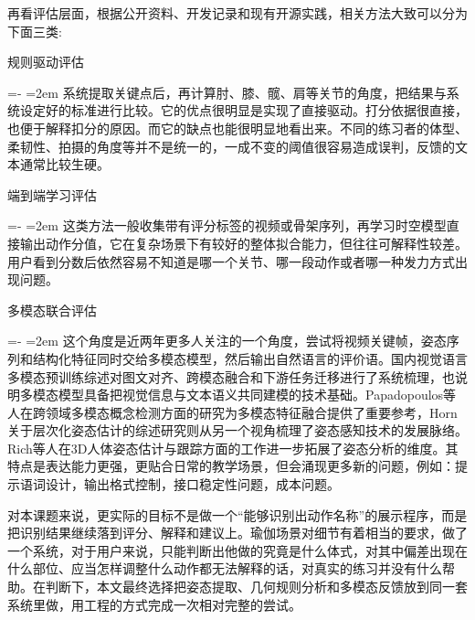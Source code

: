 \documentclass[UTF8,twoside]{ctexrep}
\makeatletter
\def@NAT@last@yr{\@citea}%
\def@NAT@last@yr{-\NAT@penalty}%
\newcommand{\researchitem}[2]{%
  \item #1%
  \par\begingroup
    \leftskip=-\leftmargin
    \rightskip=0pt
    \parindent=2em
    \noindent\hspace*{2em}\ignorespaces#2\unskip\par
  \endgroup
}
\makeatother
\begin{document}
再看评估层面，根据公开资料、开发记录和现有开源实践，相关方法大致可以分为下面三类:
\begin{researchlist}
  
\researchitem{规则驱动评估}{
    系统提取关键点后，再计算肘、膝、髋、肩等关节的角度，把结果与系统设定好的标准进行比较。它的优点很明显是实现了直接驱动。打分依据很直接，也便于解释扣分的原因。而它的缺点也能很明显地看出来。不同的练习者的体型、柔韧性、拍摄的角度等并不是统一的，一成不变的阈值很容易造成误判，反馈的文本通常比较生硬。
  }
  
\researchitem{端到端学习评估}{
    这类方法一般收集带有评分标签的视频或骨架序列，再学习时空模型直接输出动作分值，它在复杂场景下有较好的整体拟合能力，但往往可解释性较差。用户看到分数后依然容易不知道是哪一个关节、哪一段动作或者哪一种发力方式出现问题。
  }
  
\researchitem{多模态联合评估}{
    这个角度是近两年更多人关注的一个角度，尝试将视频关键帧，姿态序列和结构化特征同时交给多模态模型，然后输出自然语言的评价语。国内视觉语言多模态预训练综述对图文对齐、跨模态融合和下游任务迁移进行了系统梳理，也说明多模态模型具备把视觉信息与文本语义共同建模的技术基础\cite{ref_cn_visual_language_pretraining}。Papadopoulos等人\cite{ref_multimodal_concept}在跨领域多模态概念检测方面的研究为多模态特征融合提供了重要参考，Horn\cite{ref_pose_hierarchy}关于层次化姿态估计的综述研究则从另一个视角梳理了姿态感知技术的发展脉络。Rich等人\cite{ref_3d_pose_tracking}在3D人体姿态估计与跟踪方面的工作进一步拓展了姿态分析的维度。其特点是表达能力更强，更贴合日常的教学场景，但会涌现更多新的问题，例如：提示语词设计，输出格式控制，接口稳定性问题，成本问题。
  }
\end{researchlist}

对本课题来说，更实际的目标不是做一个“能够识别出动作名称”的展示程序，而是把识别结果继续落到评分、解释和建议上。瑜伽场景对细节有着相当的要求，做了一个系统，对于用户来说，只能判断出他做的究竟是什么体式，对其中偏差出现在什么部位、应当怎样调整什么动作都无法解释的话，对真实的练习并没有什么帮助。在判断下，本文最终选择把姿态提取、几何规则分析和多模态反馈放到同一套系统里做，用工程的方式完成一次相对完整的尝试。
\end{document}
